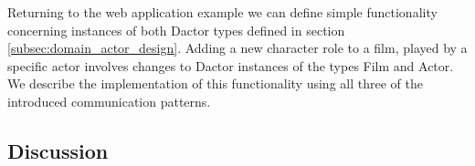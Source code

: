 Returning to the web application example we can define simple functionality concerning instances of both Dactor types defined in section \ref{subsec:domain_actor_design}.
Adding a new character role to a film, played by a specific actor involves changes to Dactor instances of the types Film and Actor.
We describe the implementation of this functionality using all three of the introduced communication patterns.


\subsection{Discussion}\label{subsec:discussion}
